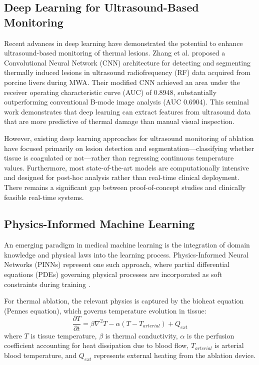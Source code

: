 \subsection{Deep Learning for Ultrasound-Based Monitoring}

Recent advances in deep learning have demonstrated the potential to enhance ultrasound-based monitoring of thermal lesions.
Zhang et al. \cite{zhang2020} proposed a Convolutional Neural Network (CNN) architecture for detecting and segmenting thermally induced lesions in ultrasound radiofrequency (RF) data acquired from porcine livers during MWA.
Their modified CNN achieved an area under the receiver operating characteristic curve (AUC) of 0.8948, substantially outperforming conventional B-mode image analysis (AUC 0.6904). This seminal work demonstrates that deep learning can extract features from ultrasound data that are more predictive of thermal damage than manual visual inspection.

However, existing deep learning approaches for ultrasound monitoring of ablation have focused primarily on lesion detection and segmentation---classifying whether tissue is coagulated or not---rather than regressing continuous temperature values.
Furthermore, most state-of-the-art models are computationally intensive and designed for post-hoc analysis rather than real-time clinical deployment.
There remains a significant gap between proof-of-concept studies and clinically feasible real-time systems.

\subsection{Physics-Informed Machine Learning}

An emerging paradigm in medical machine learning is the integration of domain knowledge and physical laws into the learning process.
Physics-Informed Neural Networks (PINNs) represent one such approach, where partial differential equations (PDEs) governing physical processes are incorporated as soft constraints during training \cite{raissi2019physics}.

For thermal ablation, the relevant physics is captured by the bioheat equation (Pennes equation), which governs temperature evolution in tissue:
\begin{equation}
    \frac{\partial T}{\partial t} = \beta \nabla^2 T - \alpha(T - T_{arterial}) + Q_{ext}
\end{equation}
where $T$ is tissue temperature, $\beta$ is thermal conductivity, $\alpha$ is the perfusion coefficient accounting for heat dissipation due to blood flow, $T_{arterial}$ is arterial blood temperature, and $Q_{ext}$ represents external heating from the ablation device.

